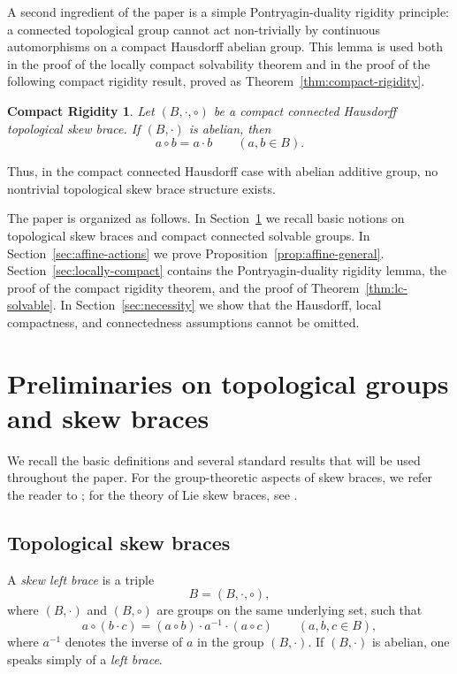 \documentclass[reqno]{amsart}
\numberwithin{equation}{section}
\newtheorem*{compactrigidity}{Compact Rigidity}
\theoremstyle{definition}
\theoremstyle{remark}
\begin{document}
A second ingredient of the paper is a simple Pontryagin-duality rigidity
principle: a connected topological group cannot act non-trivially by continuous
automorphisms on a compact Hausdorff abelian group. This lemma is used both in
the proof of the locally compact solvability theorem and in the proof of the
following compact rigidity result, proved as
Theorem~\ref{thm:compact-rigidity}.

\begin{compactrigidity}
Let $(B,\cdot,\circ)$ be a compact connected Hausdorff topological skew brace.
If $(B,\cdot)$ is abelian, then
\[
a\circ b=a\cdot b
\qquad (a,b\in B).
\]
\end{compactrigidity}

Thus, in the compact connected Hausdorff case with abelian additive group, no
nontrivial topological skew brace structure exists.

The paper is organized as follows. In Section~\ref{sec:preliminaries} we recall
basic notions on topological skew braces and compact connected solvable groups.
In Section~\ref{sec:affine-actions} we prove Proposition~\ref{prop:affine-general}.
Section~\ref{sec:locally-compact} contains the Pontryagin-duality rigidity
lemma, the proof of the compact rigidity theorem, and the proof of
Theorem~\ref{thm:lc-solvable}. In Section~\ref{sec:necessity} we show that the
Hausdorff, local compactness, and connectedness assumptions cannot be omitted.
 


\section{Preliminaries on topological groups and skew braces}\label{sec:preliminaries}

We recall the basic definitions and several standard results that will be used throughout the paper. For the group-theoretic aspects of skew braces, we refer the reader to \cite{Guarnieri2017}; for the theory of Lie skew braces, see \cite{DameleLoi2026}.

\subsection{Topological skew braces}

A \emph{skew left brace} is a triple
\[
B=(B,\cdot,\circ),
\]
where $(B,\cdot)$ and $(B,\circ)$ are groups on the same underlying set, such
that
\[
a\circ (b\cdot c)
=
(a\circ b)\cdot a^{-1}\cdot (a\circ c)
\qquad (a,b,c\in B),
\]
where $a^{-1}$ denotes the inverse of $a$ in the group $(B,\cdot)$.
If $(B,\cdot)$ is abelian, one speaks simply of a \emph{left brace}.
\end{document}
